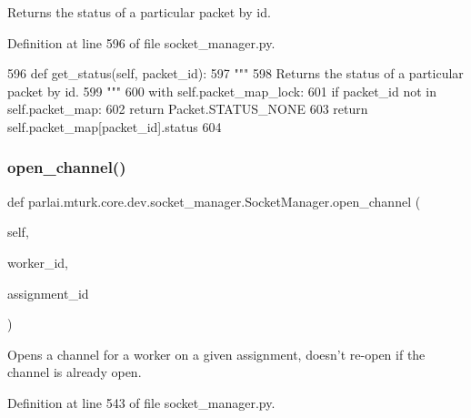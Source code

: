 \begin{DoxyVerb}Returns the status of a particular packet by id.
\end{DoxyVerb}
 

Definition at line 596 of file socket\+\_\+manager.\+py.


\begin{DoxyCode}
596     \textcolor{keyword}{def }get\_status(self, packet\_id):
597         \textcolor{stringliteral}{"""}
598 \textcolor{stringliteral}{        Returns the status of a particular packet by id.}
599 \textcolor{stringliteral}{        """}
600         with self.packet\_map\_lock:
601             \textcolor{keywordflow}{if} packet\_id \textcolor{keywordflow}{not} \textcolor{keywordflow}{in} self.packet\_map:
602                 \textcolor{keywordflow}{return} Packet.STATUS\_NONE
603             \textcolor{keywordflow}{return} self.packet\_map[packet\_id].status
604 
\end{DoxyCode}
\mbox{\label{classparlai_1_1mturk_1_1core_1_1dev_1_1socket__manager_1_1SocketManager_a9e2141e20af4e7d1f8a42837ed07f380}} 
\subsubsection{\texorpdfstring{open\+\_\+channel()}{open\_channel()}}
{\footnotesize\ttfamily def parlai.\+mturk.\+core.\+dev.\+socket\+\_\+manager.\+Socket\+Manager.\+open\+\_\+channel (\begin{DoxyParamCaption}\item[{}]{self,  }\item[{}]{worker\+\_\+id,  }\item[{}]{assignment\+\_\+id }\end{DoxyParamCaption})}

\begin{DoxyVerb}Opens a channel for a worker on a given assignment, doesn't re-open if the
channel is already open.
\end{DoxyVerb}
 

Definition at line 543 of file socket\+\_\+manager.\+py.


